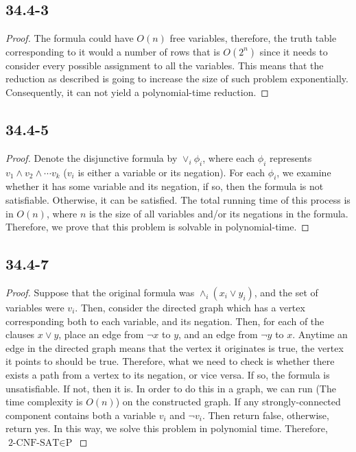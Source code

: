 \documentclass[twocolumn, 10.5pt]{article}
\begin{document}
	\subsection*{34.4-3}
	\begin{proof}
		The formula could have $O(n)$ free variables, therefore, the truth table corresponding to it would a number of rows that is $O(2^n)$ since it needs to
		consider every possible assignment to all the variables. This means that
		the reduction as described is going to increase the size of such problem exponentially. Consequently, it can not yield a polynomial-time reduction.

	\end{proof}
	\subsection*{34.4-5}
	\begin{proof}
		Denote the disjunctive formula by $\lor_i \phi_i$, where each $\phi_i$ represents $v_1\land v_2\land \cdots v_k$ ($v_i$ is either a variable or its negation). For each $\phi_i$, we examine whether it has some variable and its negation, if so, then the formula is not satisfiable. Otherwise, it can be satisfied. The total running time of this process is in $O(n)$, where $n$ is the size of all variables and/or its negations in the formula. Therefore, we prove that this problem is solvable in polynomial-time.
	\end{proof}
	\subsection*{34.4-7}
	\begin{proof}
		Suppose that the original formula was $\land_i(x_i \lor y_i)$, and the set of variables were
		${v_i}$. Then, consider the directed graph which has a vertex corresponding both
		to each variable, and its negation. Then, for each of the clauses
		$x\lor y$, place an edge from $\neg x$ to $y$, and an edge from $\neg y$ to $x$.
		Anytime an edge in the directed graph means that the vertex
		it originates is true, the vertex it points to should be true.
		Therefore, what we need to check is whether there exists a path from a vertex to its negation, or vice versa. If so, the formula is unsatisfiable. If not, then it is. In order to do this in a graph, we can run  (The time complexity is $O(n)$) on the constructed graph. If any strongly-connected component contains both a variable $v_i$ and $\neg v_i$. Then return false, otherwise, return yes. In this way, we solve this problem in polynomial time. Therefore, $\text{2-CNF-SAT}\in\text{P}$
	\end{proof}
\end{document}
